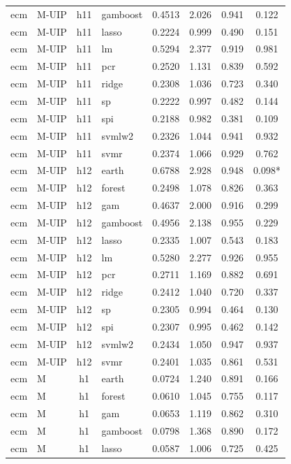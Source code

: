 \begin{ThreePartTable}
\begin{longtable}[t]{llclcccc}
ecm & M-UIP & h11 & gamboost & 0.4513 & 2.026 & 0.941 & 0.122\\
ecm & M-UIP & h11 & lasso & 0.2224 & 0.999 & 0.490 & 0.151\\
ecm & M-UIP & h11 & lm & 0.5294 & 2.377 & 0.919 & 0.981\\
ecm & M-UIP & h11 & pcr & 0.2520 & 1.131 & 0.839 & 0.592\\
ecm & M-UIP & h11 & ridge & 0.2308 & 1.036 & 0.723 & 0.340\\
ecm & M-UIP & h11 & sp & 0.2222 & 0.997 & 0.482 & 0.144\\
ecm & M-UIP & h11 & spi & 0.2188 & 0.982 & 0.381 & 0.109\\
ecm & M-UIP & h11 & svmlw2 & 0.2326 & 1.044 & 0.941 & 0.932\\
ecm & M-UIP & h11 & svmr & 0.2374 & 1.066 & 0.929 & 0.762\\
\addlinespace
ecm & M-UIP & h12 & earth & 0.6788 & 2.928 & 0.948 & 0.098*\\
ecm & M-UIP & h12 & forest & 0.2498 & 1.078 & 0.826 & 0.363\\
ecm & M-UIP & h12 & gam & 0.4637 & 2.000 & 0.916 & 0.299\\
ecm & M-UIP & h12 & gamboost & 0.4956 & 2.138 & 0.955 & 0.229\\
ecm & M-UIP & h12 & lasso & 0.2335 & 1.007 & 0.543 & 0.183\\
ecm & M-UIP & h12 & lm & 0.5280 & 2.277 & 0.926 & 0.955\\
ecm & M-UIP & h12 & pcr & 0.2711 & 1.169 & 0.882 & 0.691\\
ecm & M-UIP & h12 & ridge & 0.2412 & 1.040 & 0.720 & 0.337\\
ecm & M-UIP & h12 & sp & 0.2305 & 0.994 & 0.464 & 0.130\\
ecm & M-UIP & h12 & spi & 0.2307 & 0.995 & 0.462 & 0.142\\
ecm & M-UIP & h12 & svmlw2 & 0.2434 & 1.050 & 0.947 & 0.937\\
ecm & M-UIP & h12 & svmr & 0.2401 & 1.035 & 0.861 & 0.531\\
\addlinespace
ecm & M & h1 & earth & 0.0724 & 1.240 & 0.891 & 0.166\\
ecm & M & h1 & forest & 0.0610 & 1.045 & 0.755 & 0.117\\
ecm & M & h1 & gam & 0.0653 & 1.119 & 0.862 & 0.310\\
ecm & M & h1 & gamboost & 0.0798 & 1.368 & 0.890 & 0.172\\
ecm & M & h1 & lasso & 0.0587 & 1.006 & 0.725 & 0.425\\

\end{longtable}
\end{ThreePartTable}
